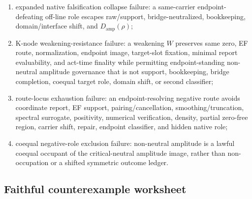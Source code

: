 \documentclass[11pt]{article}
\newcommand{\Damp}{D_{\mathrm{amp}}}
\begin{document}
\begin{enumerate}
\item expanded native falsification collapse failure: a same-carrier endpoint-defeating off-line role escapes raw/support, bridge-neutralized, bookkeeping, domain/interface shift, and \(\Damp(\rho)\);
\item K-node weakening-resistance failure: a weakening \(W\) preserves same zero, EF route, normalization, endpoint image, target-slot fixation, minimal report evaluability, and act-time finality while permitting endpoint-standing non-neutral amplitude governance that is not support, bookkeeping, bridge completion, coequal target role, domain shift, or second classifier;
\item route-locus exhaustion failure: an endpoint-resolving negative route avoids coordinate report, EF support, pairing/cancellation, smoothing/truncation, spectral surrogate, positivity, numerical verification, density, partial zero-free region, carrier shift, repair, endpoint classifier, and hidden native role;
\item coequal negative-role exclusion failure: non-neutral amplitude is a lawful coequal occupant of the critical-neutral amplitude image, rather than non-occupation or a shifted symmetric outcome ledger.
\end{enumerate}

\subsection{Faithful counterexample worksheet}
\end{document}
